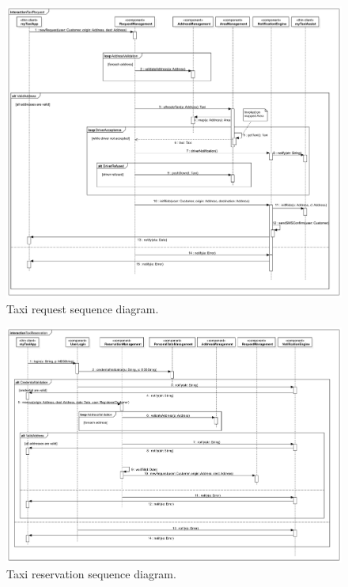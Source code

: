 \begin{figure}
	\includegraphics[width=\textwidth]{img/Sequence__Collaboration1__Interaction1__TaxiRequest_2}
	\caption{Taxi request sequence diagram.}
	\label{img:reqSequence}
\end{figure}

\begin{figure}
	\includegraphics[width=\textwidth]{img/Sequence__Collaboration2__Interaction1__TaxiReservation_3}
	\caption{Taxi reservation sequence diagram.}
	\label{img:resSequence}
\end{figure}










